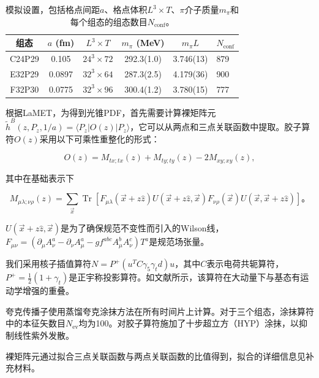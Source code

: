\documentclass[12pt,a4paper]{ctexart}
\begin{document}
\begin{table}[H]
\centering
\caption{模拟设置，包括格点间距$a$、格点体积$L^3 \times T$、$\pi$介子质量$m_\pi$和每个组态的组态数目$N_{\text{conf}}$。}
\label{tab:ensembles}
\begin{tabular}{ccccc}
\toprule
组态 & $a$ (fm) & $L^3 \times T$ & $m_\pi$ (MeV) & $m_\pi L$ & $N_{\text{conf}}$ \\
\midrule
C24P29 & 0.105  & $24^3 \times 72$ & 292.3(1.0) & 3.746(13) & 879 \\
E32P29 & 0.0897 & $32^3 \times 64$ & 287.3(2.5) & 4.179(36) & 900 \\
F32P30 & 0.0775 & $32^3 \times 96$ & 300.4(1.2) & 3.780(15) & 777 \\
\bottomrule
\end{tabular}
\end{table}

根据LaMET，为得到光锥PDF，首先需要计算裸矩阵元$\tilde{h}^B(z, P_z, 1/a) = \langle P_z|O(z)|P_z\rangle$，它可以从两点和三点关联函数中提取。胶子算符$O(z)$采用以下可乘性重整化的形式\cite{Zhang2019,Balitsky2020}：

\begin{equation}
O(z) = M_{tx;tx}(z) + M_{ty;ty}(z) - 2M_{xy;xy}(z),
\label{eq:operator}
\end{equation}

其中在基础表示下

\begin{equation}
M_{\mu\lambda;\nu\rho}(z) = \sum_{\vec{x}} \operatorname{Tr}[F_{\mu\lambda}(\vec{x} + z\hat{z})U(\vec{x} + z\hat{z},\vec{x}) F_{\nu\rho}(\vec{x})U(\vec{x},\vec{x} + z\hat{z})]。
\label{eq:Mmunu}
\end{equation}

$U(\vec{x} + z\hat{z},\vec{x})$是为了确保规范不变性而引入的Wilson线，$F_{\mu\nu} = (\partial_\mu A^a_\nu - \partial_\nu A^a_\mu - g f^{abc} A^b_\mu A^c_\nu)T^a$是规范场张量。

我们采用核子插值算符$N = P^+(u^T C\gamma_5\gamma_t d)u$，其中$C$表示电荷共轭算符，$P^+ = \frac{1}{2}(1+\gamma_t)$是正宇称投影算符。如文献\cite{Zhang2025}所示，该算符在大动量下与基态有运动学增强的重叠。

夸克传播子使用蒸馏夸克涂抹方法\cite{Peardon2009}在所有时间片上计算。对于三个组态，涂抹算符中的本征矢数目$N_{\text{ev}}$均为100。对胶子算符施加了十步超立方（HYP）涂抹，以抑制线性紫外发散。

裸矩阵元通过拟合三点关联函数与两点关联函数的比值得到，拟合的详细信息见补充材料\cite{supplemental}。
\end{document}
